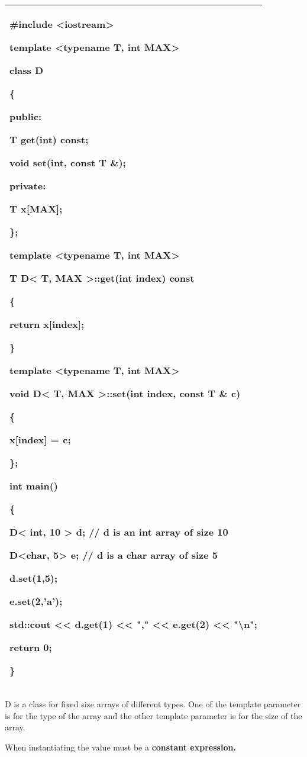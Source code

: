 \documentclass[
]{article}
\begin{document}
\begin{longtable}[]{@{}l@{}}
\toprule
\endhead
\begin{minipage}[t]{0.97\columnwidth}\raggedright
\#include \textless iostream\textgreater{}

template \textless typename T, \textbf{int} MAX\textgreater{}

class D

\{

public:

T get(int) const;

void set(int, const T \&);

private:

T x{[}MAX{]};

\};

template \textless typename T, int MAX\textgreater{}

T D\textless{} T, MAX \textgreater::get(int index) const

\{

return x{[}index{]};

\}

template \textless typename T, int MAX\textgreater{}

void D\textless{} T, MAX \textgreater::set(int index, const T \& c)

\{

x{[}index{]} = c;

\};

int main()

\{

D\textless{} int, \textbf{10} \textgreater{} d; // d is an int array of
size 10

D\textless char, \textbf{5}\textgreater{} e; // d is a char array of
size 5

d.set(1,5);

e.set(2,'a');

std::cout \textless\textless{} d.get(1) \textless\textless{} ","
\textless\textless{} e.get(2) \textless\textless{} "\textbackslash n";

return 0;

\}\strut
\end{minipage}\tabularnewline
\bottomrule
\end{longtable}

D is a class for fixed size arrays of different types. One of the
template parameter is for the type of the array and the other template
parameter is for the size of the array.

When instantiating the value must be a \textbf{constant expression.}
\end{document}
